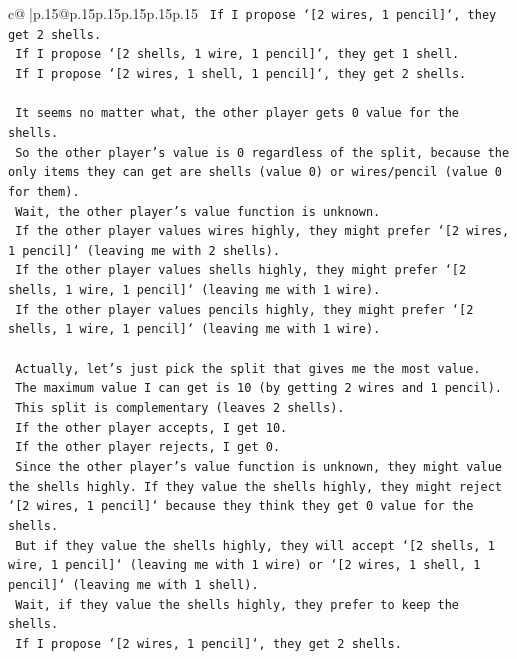 \documentclass{article}
\begin{document}
{\begin{supertabular}{c@{$\;$}|p{.15\linewidth}@{}p{.15\linewidth}p{.15\linewidth}p{.15\linewidth}p{.15\linewidth}p{.15\linewidth}}
{{{\texttt{    If I propose `{[}2 wires, 1 pencil{]}`, they get 2 shells.} \\
\texttt{    If I propose `{[}2 shells, 1 wire, 1 pencil{]}`, they get 1 shell.} \\
\texttt{    If I propose `{[}2 wires, 1 shell, 1 pencil{]}`, they get 2 shells.} \\
\\ 
\texttt{    It seems no matter what, the other player gets 0 value for the shells.} \\
\texttt{    So the other player's value is 0 regardless of the split, because the only items they can get are shells (value 0) or wires/pencil (value 0 for them).} \\
\texttt{    Wait, the other player's value function is unknown.} \\
\texttt{    If the other player values wires highly, they might prefer `{[}2 wires, 1 pencil{]}` (leaving me with 2 shells).} \\
\texttt{    If the other player values shells highly, they might prefer `{[}2 shells, 1 wire, 1 pencil{]}` (leaving me with 1 wire).} \\
\texttt{    If the other player values pencils highly, they might prefer `{[}2 shells, 1 wire, 1 pencil{]}` (leaving me with 1 wire).} \\
\\ 
\texttt{    Actually, let's just pick the split that gives me the most value.} \\
\texttt{    The maximum value I can get is 10 (by getting 2 wires and 1 pencil).} \\
\texttt{    This split is complementary (leaves 2 shells).} \\
\texttt{    If the other player accepts, I get 10.} \\
\texttt{    If the other player rejects, I get 0.} \\
\texttt{    Since the other player's value function is unknown, they might value the shells highly. If they value the shells highly, they might reject `{[}2 wires, 1 pencil{]}` because they think they get 0 value for the shells.} \\
\texttt{    But if they value the shells highly, they will accept `{[}2 shells, 1 wire, 1 pencil{]}` (leaving me with 1 wire) or `{[}2 wires, 1 shell, 1 pencil{]}` (leaving me with 1 shell).} \\
\texttt{    Wait, if they value the shells highly, they prefer to keep the shells.} \\
\texttt{    If I propose `{[}2 wires, 1 pencil{]}`, they get 2 shells.} \\
}}}
\end{supertabular}}
\end{document}
